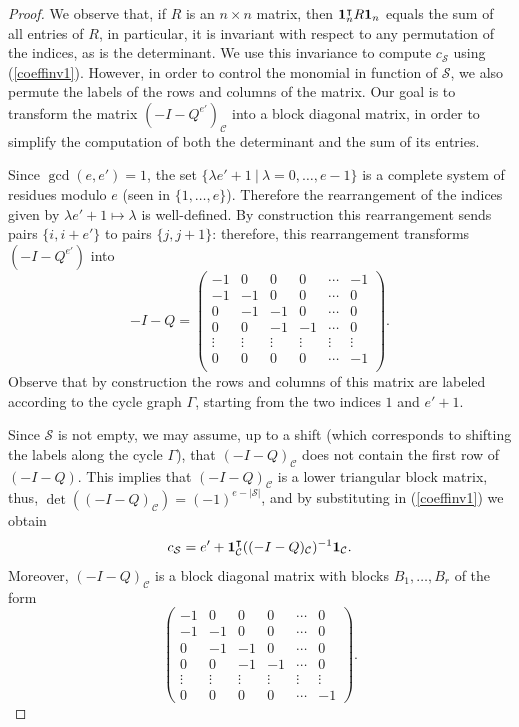 \documentclass[11pt,twoside]{amsart}
\newcommand{\cS}{\mathcal{S}}
\newcommand{\cC}{\mathcal{C}}
\theoremstyle{definition}
\numberwithin{equation}{section}
\begin{document}
\begin{proof}
We observe that, 
if $R$ is an $n \times n$ matrix, then ${\bf 1}_n ^\intercal R {\bf 1}_n$ equals the sum of all entries of $R$, 
in particular,  it is invariant with respect to any permutation of the indices, as is the determinant. 
We use this invariance to compute $c_\cS$ using  (\ref{coeffinv1}). However, in order to control the monomial in function of $\cS$, we also permute the labels of the rows and columns of the matrix. Our goal is to transform the matrix $(-I-Q^{e'})_\cC$ into a block diagonal matrix, in order to simplify the computation of both the determinant and the sum of its entries.

Since $\gcd(e,e')=1$, the set $\{\lambda e' + 1 \ | \ \lambda=0,\ldots,e-1\}$ is a complete system of residues modulo $e$ (seen in $\{1,\ldots,e\}$). Therefore the rearrangement of the indices given by $\lambda e'+1 \mapsto \lambda$ is well-defined. 
By construction this rearrangement sends pairs $\{i, i+e'\}$  to pairs $\{j,j+1\}$: therefore,  this rearrangement transforms $(-I-Q^{e'})$ into
$$-I-Q=\begin{pmatrix}
-1 & 0 & 0 & 0 &\cdots & -1 \\
-1 & -1 & 0 & 0 & \cdots & 0  \\
0 & -1 & -1 & 0 & \cdots & 0  \\
0 & 0 & -1 & -1 & \cdots & 0 \\
\vdots & \vdots & \vdots & \vdots & \vdots & \vdots \\
0 & 0 & 0 & 0 & \cdots & -1 \\
\end{pmatrix}.
$$
Observe that by construction the rows and columns of this matrix are labeled according to the cycle graph $\Gamma$, starting from the two indices $1$ and $e'+1$. 

Since $\cS$ is not empty,  we may assume, 
up to a shift (which corresponds to shifting the labels along the cycle $\Gamma$),  that $(-I-Q)_\cC$ does not contain the first row of $(-I-Q)$. 
This implies that $(-I-Q)_\cC$ is a lower triangular block matrix, thus, $\det((-I-Q)_\cC)=(-1)^{e-|\cS|}$, and by substituting in (\ref{coeffinv1}) we obtain
\begin{equation}\label{coeffinv2}
c_\cS=e'+{\bf 1}_\cC^\intercal ((-I-Q)_\cC)^{-1}{\bf 1}_\cC.
\end{equation}
Moreover, $(-I-Q)_\cC$ is a block diagonal matrix with blocks 
$B_1,\ldots,B_r$ of the form 
$$
\begin{pmatrix}
-1 & 0 & 0 & 0 &\cdots & 0  \\
-1 & -1 & 0 & 0 & \cdots & 0  \\
0 & -1 & -1 & 0 & \cdots & 0  \\
0 & 0 & -1 & -1 & \cdots & 0 \\
\vdots & \vdots & \vdots & \vdots & \vdots & \vdots \\
0 & 0 & 0 & 0 & \cdots & -1 
\end{pmatrix}.$$


\end{proof}
\end{document}
